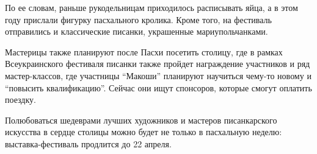 По ее словам, раньше рукодельницам приходилось расписывать яйца, а в этом году
прислали фигурку пасхального кролика. Кроме того, на фестиваль отправились и
классические писанки, украшенные мариупольчанками.


Мастерицы также планируют после Пасхи посетить столицу, где в рамках
Всеукраинского фестиваля писанки также пройдет награждение участников и ряд
мастер-классов, где участницы \enquote{Макоши} планируют научиться чему-то новому и
\enquote{повысить квалификацию}. Сейчас они ищут спонсоров, которые смогут оплатить
поездку.

Полюбоваться шедеврами лучших художников и мастеров писанкарского искусства в
сердце столицы можно будет не только в пасхальную неделю: выставка-фестиваль
продлится до 22 апреля.
